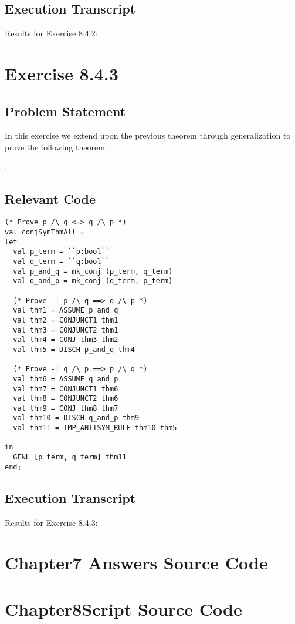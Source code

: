 \documentclass[letterpaper]{report}
\begin{document}
\section{Execution Transcript}

Results for Exercise 8.4.2:




\newpage


\chapter{Exercise 8.4.3}
\label{sec:ex-8-4-3}

\section{Problem Statement}

In this exercise we extend upon the previous theorem through generalization to 
prove the following theorem:

\HOLchapterEightTheoremsconjSymThmAll.

\section{Relevant Code}

\begin{lstlisting}
(* Prove p /\ q <=> q /\ p *)
val conjSymThmAll =
let
  val p_term = ``p:bool``
  val q_term = ``q:bool``
  val p_and_q = mk_conj (p_term, q_term)
  val q_and_p = mk_conj (q_term, p_term)

  (* Prove -| p /\ q ==> q /\ p *)
  val thm1 = ASSUME p_and_q
  val thm2 = CONJUNCT1 thm1
  val thm3 = CONJUNCT2 thm1
  val thm4 = CONJ thm3 thm2
  val thm5 = DISCH p_and_q thm4

  (* Prove -| q /\ p ==> p /\ q *)
  val thm6 = ASSUME q_and_p
  val thm7 = CONJUNCT1 thm6
  val thm8 = CONJUNCT2 thm6
  val thm9 = CONJ thm8 thm7
  val thm10 = DISCH q_and_p thm9
  val thm11 = IMP_ANTISYM_RULE thm10 thm5

in
  GENL [p_term, q_term] thm11
end;
\end{lstlisting}

\section{Execution Transcript}

Results for Exercise 8.4.3:




\newpage


\appendix

\chapter{Chapter7 Answers Source Code}
\label{cha:chapt-answ-source}



\newpage

\chapter{Chapter8Script Source Code}
\label{cha:chapt-source-code}



\end{document}
